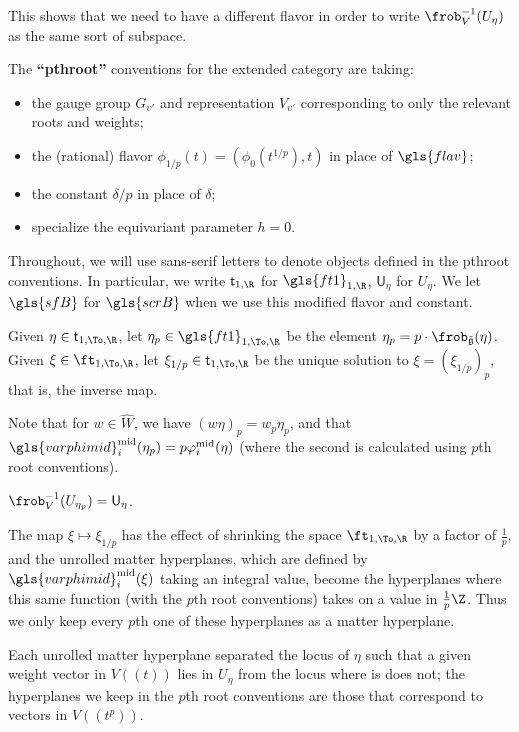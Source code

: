 This shows that we need to have a different flavor in order to write $\frob_V^{-1}(U_\eta)$ as the same sort of subspace.  
\begin{definition}\label{def:pth-root}
  The {\bf ``\gls{pthroot}''} conventions for the extended category are taking:
  \begin{itemize}
    \item the gauge group $G_{\upsilon'}$ and representation $V_{\upsilon'}$ corresponding to only the relevant roots and weights;
      \item the (rational) flavor $\phi_{1/p}(t)=(\phi_0(t^{1/p}),t)$ in place of $\gls{flav}$;
      \item the constant $\delta/p$ in place of $\delta$;
      \item specialize the equivariant parameter $h=0$.
  \end{itemize}
  Throughout, we will use sans-serif letters to denote objects defined
  in the \gls{pthroot} conventions. In particular, we write
  $\mathsf{t}_{1,\R}$ for  $\gls{ft1}_{1,\R}$,  $\mathsf{U}_\eta$ for
  $U_{\eta}$.  We let $\gls{sfB}$ for $\gls{scrB}$ when we use this
  modified flavor and constant. 
\end{definition}

\begin{definition}
  Given $\eta\in \mathsf{t}_{1,\To,\R} $, let $\eta_p\in\gls{ft1}_{1,\To,\R}$ be the
  element  $\eta_p=p\cdot \frob_{\mathfrak{\tilde{g}}}(\eta)$.  Given
  $\xi\in \ft_{1,\To,\R}$, let  $\xi_{1/p}\in \mathsf{t}_{1,\To,\R}$ be the unique solution to $\xi=(\xi_{1/p})_p$, that is, the inverse map.
\end{definition}
Note that for $w\in \widehat{W}$, we have $(w\eta)_p=w_p\eta_p$, and that $\gls{varphimid}^{\operatorname{mid}}_i(\eta_p)=p\mathsf{\varphi}^{\operatorname{mid}}_i(\eta)$ (where the second is calculated using $p$th root conventions).
\begin{lemma}
  $\frob_V^{-1}(U_{\eta_p})=\mathsf{U}_{\eta}$.
\end{lemma}
\begin{remark}
  The map $\xi\mapsto \xi_{1/p}$ has the effect of shrinking the space
  $\ft_{1,\To,\R}$ by a factor of $\frac{1}{p}$, and the unrolled matter
  hyperplanes, which are defined by  $\gls{varphimid}_i^{\operatorname{mid}}(\xi)$ taking an
  integral value, become the hyperplanes where this same function
  (with the $p$th root conventions)  takes on a value in
  $\frac{1}{p}\Z$.  Thus we only keep every $p$th one of these
  hyperplanes as a matter hyperplane.

  Each unrolled matter hyperplane separated the locus of $\eta$ such
  that a given weight vector in $V((t))$ lies in $U_\eta$ from the
  locus where is does not; the hyperplanes we keep in the $p$th root
  conventions are those that correspond to vectors in $V((t^p))$.
\end{remark}

